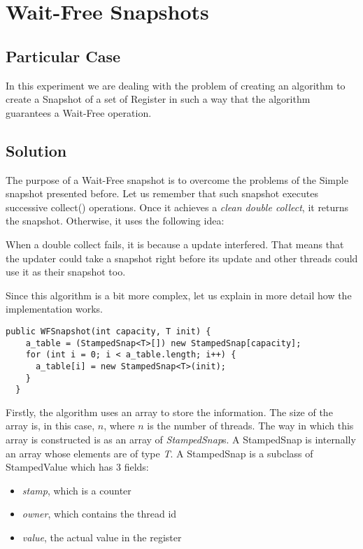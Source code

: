 \section{\textbf{Wait-Free Snapshots}}
\subsection{Particular Case}
\par
In this experiment we are dealing with the problem of creating an algorithm to
create a Snapshot of a set of Register in such a way that the algorithm
guarantees a Wait-Free operation.
\par
\subsection{Solution}
\par
The purpose of a Wait-Free snapshot is to overcome the problems of the Simple
snapshot presented before. Let us remember that such snapshot executes successive
collect() operations. Once it achieves a \textit{clean double collect}, it
returns the snapshot. Otherwise, it uses the following idea:
\par
When a double collect fails, it is because a update interfered. That means that
the updater could take a snapshot right before its update and other threads
could use it as their snapshot too. 
\par
Since this algorithm is a bit more complex, let us explain in more detail how
the implementation works.
\par
\hfill
\begin{lstlisting}[style=numbers]
  public WFSnapshot(int capacity, T init) {
    a_table = (StampedSnap<T>[]) new StampedSnap[capacity];
    for (int i = 0; i < a_table.length; i++) {
      a_table[i] = new StampedSnap<T>(init);
    }   
  }
\end{lstlisting}
\hfill
\par
Firstly, the algorithm uses an array to store the information.
The size of the array is, in this case, $n$, where $n$ is the number of
threads. The way in which this array is constructed is as an array of
\textit{StampedSnap}s. A StampedSnap is internally an array whose elements are
of type \textit{T}. A StampedSnap is a subclass of StampedValue which has 3
fields:
\par
\begin{itemize}
\item \textit{stamp}, which is a counter
\item \textit{owner}, which contains the thread id
\item \textit{value}, the actual value in the register
\end{itemize}
